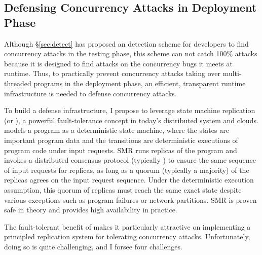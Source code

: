 

\subsection{Defensing Concurrency Attacks in Deployment Phase} 
\label{sec:defense}

Although \S\ref{sec:detect} has proposed an detection scheme for developers to 
find concurrency attacks in the testing phase, this scheme can not catch 100\% 
attacks because it is designed to find attacks on the concurrency bugs it meets 
at runtime. Thus, to practically prevent concurrency attacks taking over 
multi-threaded programs in the deployment phase, an efficient, transparent 
runtime infrastructure is needed to defense concurrency attacks.

To build a defense infrastructure, I propose to leverage state machine 
replication (or \smr), a powerful fault-tolerance concept in today's 
distributed system and clouds. \smr models a program as a deterministic
state machine, where the states are important program data and the transitions 
are deterministic executions of program code under input requests. SMR runs 
replicas of the program and invokes a distributed consensus protocol 
(typically \paxos) to ensure the same sequence of input requests for replicas, 
as long as a quorum (typically a majority) of the replicas agrees on the input 
request sequence. Under the deterministic execution assumption, this quorum of 
replicas must reach the same exact state despite various exceptions such as 
program failures or network partitions. SMR is proven safe in theory and 
provides high availability in practice.

The fault-tolerant benefit of \smr makes it particularly attractive
on implementing a principled replication system for tolerating concurrency 
attacks. Unfortunately, doing so is quite challenging, and I forsee four 
challenges.

